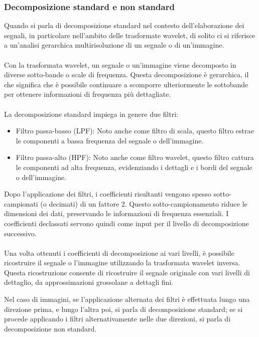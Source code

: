 \documentclass{subfiles}
\begin{document}
\subsubsection{Decomposizione standard e non standard}
Quando si parla di decomposizione standard nel contesto dell'elaborazione dei segnali, in particolare nell'ambito delle trasformate wavelet,
di solito ci si riferisce a un'analisi gerarchica multirisoluzione di un segnale o di un'immagine.
\\ \\
Con la trasformata wavelet, un segnale o un'immagine viene decomposto in diverse sotto-bande o scale di frequenza. Questa decomposizione è gerarchica,
il che significa che è possibile continuare a scomporre ulteriormente le sottobande per ottenere informazioni di frequenza più dettagliate.
\\ \\
La decomposizione standard impiega in genere due filtri:
\begin{itemize}
    \item Filtro passa-basso (LPF): Noto anche come filtro di scala, questo filtro estrae le componenti a bassa frequenza del segnale o dell'immagine.
    \item Filtro passa-alto (HPF): Noto anche come filtro wavelet, questo filtro cattura le componenti ad alta frequenza, evidenziando i dettagli e i bordi del segnale o dell'immagine.
\end{itemize}

Dopo l'applicazione dei filtri, i coefficienti risultanti vengono spesso sotto-campionati (o decimati) di un fattore 2.
Questo sotto-campionamento riduce le dimensioni dei dati, preservando le informazioni di frequenza essenziali. I coefficienti declassati servono quindi come input per il livello di decomposizione successivo.
\\ \\
Una volta ottenuti i coefficienti di decomposizione ai vari livelli, è possibile ricostruire il segnale o l'immagine utilizzando la trasformata wavelet inversa.
Questa ricostruzione consente di ricostruire il segnale originale con vari livelli di dettaglio, da approssimazioni grossolane a dettagli fini.

\begin{Note*}
    Nel caso di immagini, se l'applicazione alternata dei filtri è effettuata lungo una direzione prima, e lungo l'altra poi, si parla di decomposizione standard;
    se si procede applicando i filtri alternativamente nelle due direzioni, si parla di decomposizione non standard.
\end{Note*}
\end{document}

